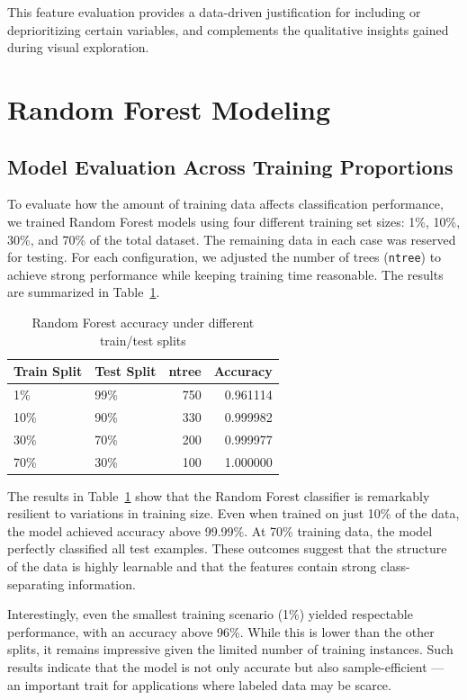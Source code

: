 \documentclass[a4paper,11pt]{article}
\begin{document}
This feature evaluation provides a data-driven justification for including or deprioritizing certain variables, and complements the qualitative insights gained during visual exploration.

\section{Random Forest Modeling}

\subsection{Model Evaluation Across Training Proportions}

To evaluate how the amount of training data affects classification performance, we trained Random Forest models using four different training set sizes: 1\%, 10\%, 30\%, and 70\% of the total dataset. The remaining data in each case was reserved for testing. For each configuration, we adjusted the number of trees (\texttt{ntree}) to achieve strong performance while keeping training time reasonable. The results are summarized in Table~\ref{tab:rf_accuracy}.

\begin{table}[h]
	\centering
	\begin{tabular}{|l|l|r|r|}
	\hline
	\textbf{Train Split} & \textbf{Test Split} & \textbf{ntree} & \textbf{Accuracy} \\
	\hline
	1\%   & 99\%  & 750 & 0.961114 \\
	10\%  & 90\%  & 330 & 0.999982 \\
	30\%  & 70\%  & 200 & 0.999977 \\
	70\%  & 30\%  & 100 & 1.000000 \\
	\hline
	\end{tabular}
	\caption{Random Forest accuracy under different train/test splits}
	\label{tab:rf_accuracy}
\end{table}

The results in Table~\ref{tab:rf_accuracy} show that the Random Forest classifier is remarkably resilient to variations in training size. Even when trained on just 10\% of the data, the model achieved accuracy above 99.99\%. At 70\% training data, the model perfectly classified all test examples. These outcomes suggest that the structure of the data is highly learnable and that the features contain strong class-separating information. 

Interestingly, even the smallest training scenario (1\%) yielded respectable performance, with an accuracy above 96\%. While this is lower than the other splits, it remains impressive given the limited number of training instances. Such results indicate that the model is not only accurate but also sample-efficient — an important trait for applications where labeled data may be scarce.
\end{document}
